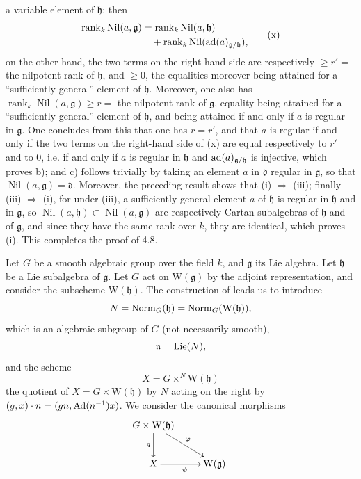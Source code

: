 a variable element of $\mathfrak h$; then
\[
\begin{aligned}
 \operatorname{rank}_k\operatorname{Nil}(a,\mathfrak g)
 &=\operatorname{rank}_k\operatorname{Nil}(a,\mathfrak h)\\
 &\quad+\operatorname{rank}_k\operatorname{Nil}(\operatorname{ad}(a)_{\mathfrak g/\mathfrak h}),
\end{aligned}\tag{x}
\]
on the other hand, the two terms on the right-hand side are respectively
$\geq r'=$ the nilpotent rank of $\mathfrak h$, and $\geq0$, the
equalities moreover being attained for a ``sufficiently general''
element of $\mathfrak h$. Moreover, one also has
$\operatorname{rank}_k\operatorname{Nil}(a,\mathfrak g)\geq r=$ the
nilpotent rank of $\mathfrak g$, equality being attained for a
``sufficiently general'' element of $\mathfrak h$, and being attained
if and only if $a$ is regular in $\mathfrak g$. One concludes from
this that one has $r=r'$, and that $a$ is regular if and only if
the two terms on the right-hand side of (x) are equal respectively
to $r'$ and to $0$, i.e. if and only if $a$ is regular in
$\mathfrak h$ and $\operatorname{ad}(a)_{\mathfrak g/\mathfrak h}$ is injective,
which proves b); and c) follows trivially by taking an element $a$
in $\mathfrak d$ regular in $\mathfrak g$, so that
$\operatorname{Nil}(a,\mathfrak g)=\mathfrak d$. Moreover, the preceding
result shows that (i) $\Rightarrow$ (iii); finally (iii)
$\Rightarrow$ (i), for under (iii), a sufficiently general element
$a$ of $\mathfrak h$ is regular in $\mathfrak h$ and in
$\mathfrak g$, so $\operatorname{Nil}(a,\mathfrak h)\subset
\operatorname{Nil}(a,\mathfrak g)$ are respectively Cartan subalgebras
of $\mathfrak h$ and of $\mathfrak g$, and since they have the same
rank over $k$, they are identical, which proves (i). This completes
the proof of 4.8.

Let $G$ be a smooth algebraic group over the field $k$, and
$\mathfrak g$ its Lie algebra. Let $\mathfrak h$ be a Lie subalgebra
of $\mathfrak g$. Let $G$ act on $\mathrm W(\mathfrak g)$ by the
adjoint representation, and consider the subscheme
$\mathrm W(\mathfrak h)$. The construction of  leads us to introduce
\[
 N=\operatorname{Norm}_G(\mathfrak h)=\operatorname{Norm}_G(\mathrm W(\mathfrak h)),
\]
which is an algebraic subgroup of $G$ (not necessarily smooth),
\[
 \mathfrak n=\operatorname{Lie}(N),
\]
and the scheme
\[
 X=G\times^N\mathrm W(\mathfrak h)
\]
the quotient of $X=G\times\mathrm W(\mathfrak h)$ by $N$ acting on
the right by $(g,x)\cdot n=(gn,\operatorname{Ad}(n^{-1})x)$.
We consider the canonical morphisms
\[
\xymatrix{
 G\times\mathrm W(\mathfrak h)\ar[d]_q\ar[dr]^\varphi&\\
 X\ar[r]_\psi&\mathrm W(\mathfrak g).
}
\]


